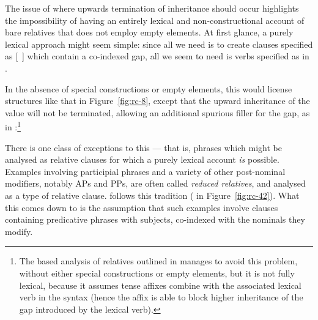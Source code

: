\documentclass[output=paper,biblatex,babelshorthands,newtxmath,draftmode,colorlinks,citecolor=brown]{langscibook}
\begin{document}
The issue of where upwards termination of  inheritance should occur
highlights the impossibility of having an entirely lexical and non-constructional account
of bare relatives that does not employ empty elements. At first glance, a purely lexical
approach might seem
simple: since all we need is to create clauses specified as [~] which contain a
co-indexed gap, all we seem to need is verbs specified as in .
\begin{exe}\ex\label{x:rc-97}
\end{exe}
In the absence of special constructions or empty elements, this would license structures
like that in Figure~\ref{fig:rc-8}, except that the upward inheritance of the  value will not be
terminated, allowing an additional spurious filler for the gap, as in
:\footnote{The  based analysis of  relatives outlined in
  \citet{SiraiGunjiRelative} manages to avoid this problem, without either special
  constructions or empty elements, but it is not fully lexical, because it assumes 
  tense affixes combine with the associated lexical verb in the syntax (hence the affix is
  able to block higher inheritance of the gap introduced by the lexical verb).}
\begin{exe}
\end{exe} 

\largerpage[-1]
There is one class of exceptions to this --- that is, phrases which might be analysed as
relative clauses for
which a purely lexical account \emph{is} possible. Examples involving participial phrases
and a variety of other post-nominal modifiers, notably APs and PPs, are often called
\emph{reduced relatives}, and analysed as a type of relative clause.  \citet[471]{Sag:97}
follows this tradition ( in Figure~\ref{fig:rc-42}). What this comes down to is the assumption that such examples
involve clauses containing predicative phrases with  subjects, co-indexed with
the nominals they modify. 
\end{document}

